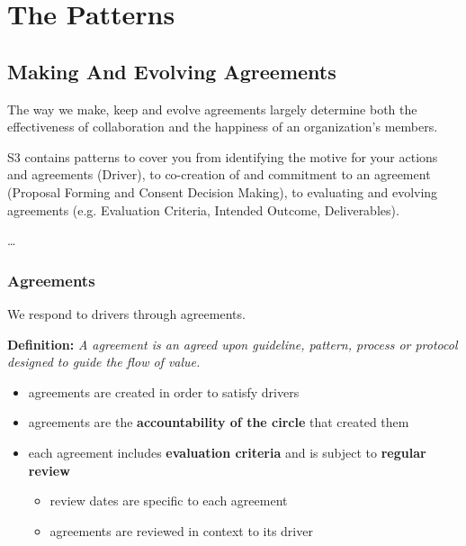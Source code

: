 \part{The Patterns}
\label{thepatterns}

\chapter{Making And Evolving Agreements}
\label{makingandevolvingagreements}

The way we make, keep and evolve agreements largely determine both the effectiveness of collaboration and the happiness of an organization's members.

S3 contains patterns to cover you from identifying the motive for your actions and agreements (Driver), to co-creation of and commitment to an agreement (Proposal Forming and Consent Decision Making), to evaluating and evolving agreements (e.g. Evaluation Criteria, Intended Outcome, Deliverables).

{\ldots}

\section{Agreements}
\label{agreements}

We respond to drivers through agreements.

\textbf{Definition:} \emph{A agreement is an agreed upon guideline, pattern, process or protocol designed to guide the flow of value.}

\begin{itemize}
\item agreements are created in order to satisfy drivers

\item agreements are the \textbf{accountability of the circle} that created them

\item each agreement includes \textbf{evaluation criteria} and is subject to \textbf{regular review}

\begin{itemize}
\item review dates are specific to each agreement

\item agreements are reviewed in context to its driver

\end{itemize}

\end{itemize}

